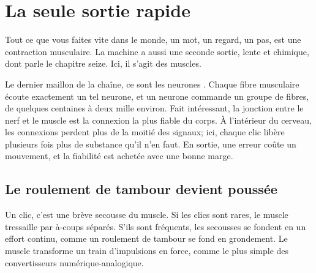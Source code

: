 \chapter{La seule sortie rapide}

Tout ce que vous faites vite dans le monde, un mot, un regard, un pas, est une contraction musculaire. La machine a aussi une seconde sortie, lente et chimique, dont parle le chapitre seize. Ici, il s'agit des muscles.

Le dernier maillon de la chaîne, ce sont les neurones . Chaque fibre musculaire écoute exactement un tel neurone, et un neurone commande un groupe de fibres, de quelques centaines à deux mille environ. Fait intéressant, la jonction entre le nerf et le muscle est la connexion la plus fiable du corps. À l'intérieur du cerveau, les connexions perdent plus de la moitié des signaux; ici, chaque clic libère plusieurs fois plus de substance qu'il n'en faut. En sortie, une erreur coûte un mouvement, et la fiabilité est achetée avec une bonne marge.

\section*{Le roulement de tambour devient poussée}

Un clic, c'est une brève secousse du muscle. Si les clics sont rares, le muscle tressaille par à-coups séparés. S'ils sont fréquents, les secousses se fondent en un effort continu, comme un roulement de tambour se fond en grondement. Le muscle transforme un train d'impulsions en force, comme le plus simple des convertisseurs numérique-analogique.

